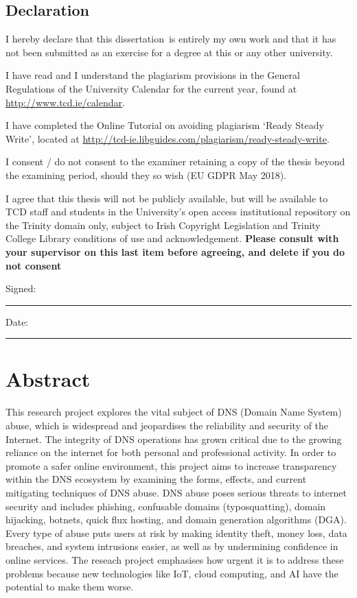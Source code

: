 \documentclass[a4paper,oneside,12pt]{book}
\title{\thesistitle}
\author{\authorname}
\newcommand{\typeofthesis}{dissertation} %
\numberwithin{equation}{chapter} %
\begin{document}

\section*{\Huge\textcolor{tcd_blue}{Declaration}}
\vspace{1cm}
I hereby declare that this \typeofthesis\ is entirely my own work and that it has not been submitted as an exercise for a degree at this or any other university.

\vspace{1cm}
I have read and I understand the plagiarism provisions in the General Regulations of the University Calendar for the current year, found at \url{http://www.tcd.ie/calendar}.
\vspace{1cm}

I have completed the Online Tutorial on avoiding plagiarism `Ready Steady Write', located at \url{http://tcd-ie.libguides.com/plagiarism/ready-steady-write}.
\vspace{1cm}

I consent / do not consent to the examiner retaining a copy of the thesis beyond the examining period, should they so wish (EU GDPR May 2018).
\vspace{1cm}

I agree that this thesis will not be publicly available, but will be available to TCD staff and students in the University’s open access institutional repository on the Trinity domain only, subject to Irish Copyright Legislation and Trinity College Library conditions of use and acknowledgement.  \textbf{Please consult with your supervisor on this last item before agreeing, and delete if you do not consent}
\vspace{3cm}

Signed:~\rule{5cm}{0.3pt}\hfill Date:~\rule{5cm}{0.3pt}

\chapter*{Abstract}

This research project explores the vital subject of DNS (Domain Name System) abuse, which is widespread and jeopardises the reliability and security of the Internet. The integrity of DNS operations has grown critical due to the growing reliance on the internet for both personal and professional activity. In order to promote a safer online environment, this project aims to increase transparency within the DNS ecosystem by examining the forms, effects, and current mitigating techniques of DNS abuse. DNS abuse poses serious threats to internet security and includes phishing, confusable domains (typosquatting), domain hijacking, botnets, quick flux hosting, and domain generation algorithms (DGA). Every type of abuse puts users at risk by making identity theft, money loss, data breaches, and system intrusions easier, as well as by undermining confidence in online services. The reseach project emphasises how urgent it is to address these problems because new technologies like IoT, cloud computing, and AI have the potential to make them worse.
\end{document}
